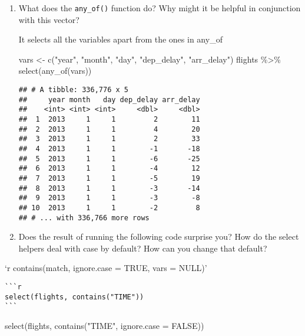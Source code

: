 \documentclass[
]{article}
\newenvironment{Shaded}{\begin{snugshade}}{\end{snugshade}}
\newcommand{\AttributeTok}[1]{\textcolor[rgb]{0.77,0.63,0.00}{#1}}
\newcommand{\ConstantTok}[1]{\textcolor[rgb]{0.00,0.00,0.00}{#1}}
\newcommand{\FunctionTok}[1]{\textcolor[rgb]{0.00,0.00,0.00}{#1}}
\newcommand{\NormalTok}[1]{#1}
\newcommand{\OtherTok}[1]{\textcolor[rgb]{0.56,0.35,0.01}{#1}}
\newcommand{\SpecialCharTok}[1]{\textcolor[rgb]{0.00,0.00,0.00}{#1}}
\newcommand{\StringTok}[1]{\textcolor[rgb]{0.31,0.60,0.02}{#1}}
\begin{document}
\begin{enumerate}
\def\labelenumi{\arabic{enumi}.}
\setcounter{enumi}{2}
\item
  What does the \texttt{any\_of()} function do? Why might it be helpful
  in conjunction with this vector?

  It selects all the variables apart from the ones in any\_of

\begin{Shaded}
\begin{Highlighting}[]
\NormalTok{vars }\OtherTok{\textless{}{-}} \FunctionTok{c}\NormalTok{(}\StringTok{"year"}\NormalTok{, }\StringTok{"month"}\NormalTok{, }\StringTok{"day"}\NormalTok{, }\StringTok{"dep\_delay"}\NormalTok{, }\StringTok{"arr\_delay"}\NormalTok{)}
\NormalTok{flights }\SpecialCharTok{\%\textgreater{}\%} \FunctionTok{select}\NormalTok{(}\FunctionTok{any\_of}\NormalTok{(vars))}
\end{Highlighting}
\end{Shaded}

\begin{verbatim}
## # A tibble: 336,776 x 5
##     year month   day dep_delay arr_delay
##    <int> <int> <int>     <dbl>     <dbl>
##  1  2013     1     1         2        11
##  2  2013     1     1         4        20
##  3  2013     1     1         2        33
##  4  2013     1     1        -1       -18
##  5  2013     1     1        -6       -25
##  6  2013     1     1        -4        12
##  7  2013     1     1        -5        19
##  8  2013     1     1        -3       -14
##  9  2013     1     1        -3        -8
## 10  2013     1     1        -2         8
## # ... with 336,766 more rows
\end{verbatim}
\item
  Does the result of running the following code surprise you? How do the
  select helpers deal with case by default? How can you change that
  default?
\end{enumerate}

`r contains(match, ignore.case = TRUE, vars = NULL)'

\begin{verbatim}
```r
select(flights, contains("TIME"))
```
\end{verbatim}

\begin{Shaded}
\begin{Highlighting}[]
    \FunctionTok{select}\NormalTok{(flights, }\FunctionTok{contains}\NormalTok{(}\StringTok{"TIME"}\NormalTok{, }\AttributeTok{ignore.case =} \ConstantTok{FALSE}\NormalTok{))}
\end{Highlighting}
\end{Shaded}
\end{document}
